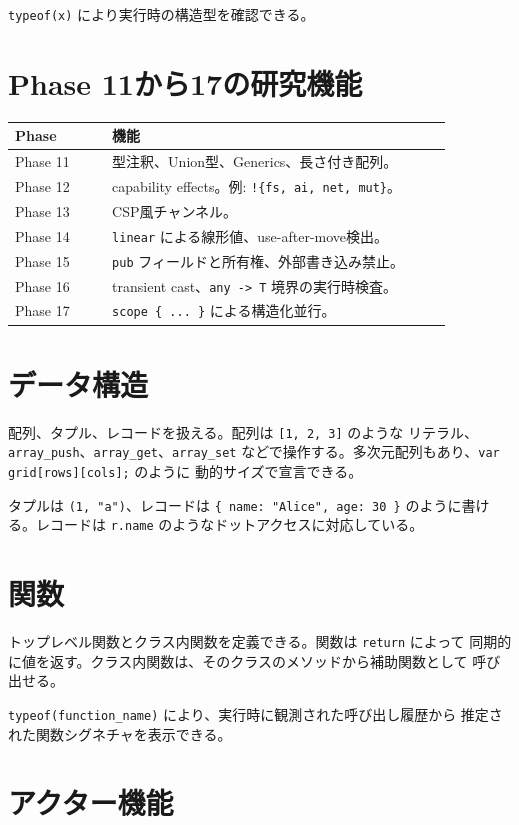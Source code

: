 \documentclass[11pt,a4paper,uplatex,dvipdfmx]{jsarticle}
\begin{document}
\texttt{typeof(x)} により実行時の構造型を確認できる。

\section{Phase 11から17の研究機能}

\begin{longtable}{p{0.20\linewidth}p{0.70\linewidth}}
\toprule
Phase & 機能 \\
\midrule
Phase 11 & 型注釈、Union型、Generics、長さ付き配列。 \\
Phase 12 & capability effects。例: \texttt{!\{fs, ai, net, mut\}}。 \\
Phase 13 & CSP風チャンネル。 \\
Phase 14 & \texttt{linear} による線形値、use-after-move検出。 \\
Phase 15 & \texttt{pub} フィールドと所有権、外部書き込み禁止。 \\
Phase 16 & transient cast、\texttt{any -> T} 境界の実行時検査。 \\
Phase 17 & \texttt{scope \{ ... \}} による構造化並行。 \\
\bottomrule
\end{longtable}

\section{データ構造}

配列、タプル、レコードを扱える。配列は \texttt{[1, 2, 3]} のような
リテラル、\texttt{array\_push}、\texttt{array\_get}、\texttt{array\_set}
などで操作する。多次元配列もあり、\texttt{var grid[rows][cols];} のように
動的サイズで宣言できる。

タプルは \texttt{(1, "a")}、レコードは
\texttt{\{ name: "Alice", age: 30 \}} のように書ける。レコードは
\texttt{r.name} のようなドットアクセスに対応している。

\section{関数}

トップレベル関数とクラス内関数を定義できる。関数は \texttt{return} によって
同期的に値を返す。クラス内関数は、そのクラスのメソッドから補助関数として
呼び出せる。

\texttt{typeof(function\_name)} により、実行時に観測された呼び出し履歴から
推定された関数シグネチャを表示できる。

\section{アクター機能}
\end{document}
